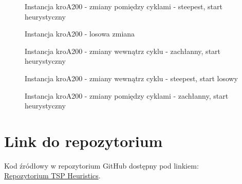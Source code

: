 \documentclass[11pt]{article}
\begin{document}
\begin{figure}[H]
    \centering
    \caption{Instancja kroA200 - zmiany pomiędzy cyklami - steepest, start heurystyczny}
    \label{fig:Steepest-cycle-changes-kroA-intercycle-heuristic}
\end{figure}

\begin{figure}[H]
    \centering
    \caption{Instancja kroA200 - losowa zmiana}
    \label{fig:Random-path-kroA}
\end{figure}

\begin{figure}[H]
    \centering
    \caption{Instancja kroA200 - zmiany wewnątrz cyklu - zachłanny, start heurystyczny}
    \label{fig:Greedy-cycle-changes-kroA-heuristic}
\end{figure}

\begin{figure}[H]
    \centering
    \caption{Instancja kroA200 - zmiany wewnątrz cyklu - steepest, start losowy}
    \label{fig:Steepest-cycle-changes-kroA-random}
\end{figure}

\begin{figure}[H]
    \centering
    \caption{Instancja kroA200 - zmiany pomiędzy cyklami - zachłanny, start heurystyczny}
    \label{fig:Greedy-cycle-changes-kroA-intercycle-heuristic}
\end{figure}


\section{Link do repozytorium}\label{sec:link-do-repo}
Kod źródłowy w repozytorium GitHub dostępny pod linkiem: \\
\href{https://github.com/KotZPolibudy/PUT_IMO/tree/main/Local_search}{Repozytorium TSP Heuristics}.
\end{document}
